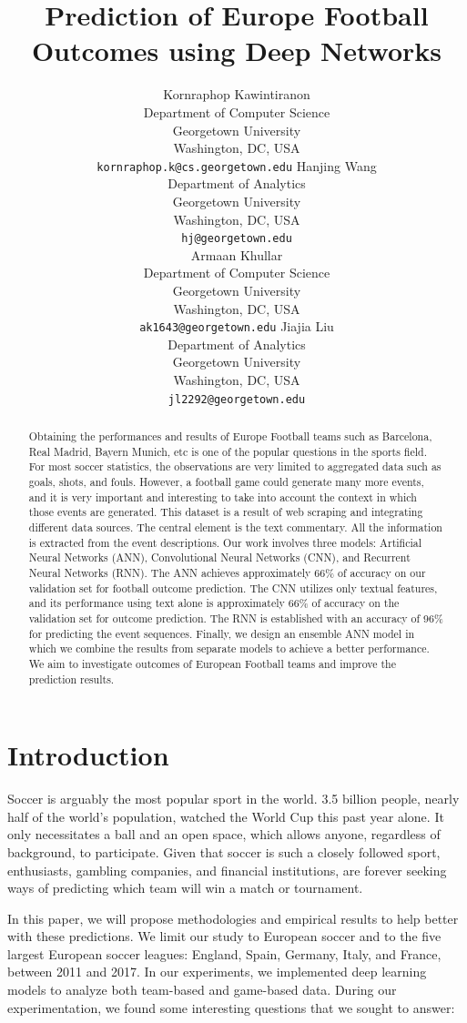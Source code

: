 \documentclass[11pt,a4paper]{article}
\title{Prediction of Europe Football Outcomes using Deep Networks}
\author{Kornraphop Kawintiranon \\
  Department of Computer Science \\
  Georgetown University \\
  Washington, DC, USA \\
  {\tt kornraphop.k@cs.georgetown.edu} \And
  Hanjing Wang \\
  Department of Analytics \\
  Georgetown University \\
  Washington, DC, USA \\
  {\tt hj@georgetown.edu}\\\AND
  Armaan Khullar \\
  Department of Computer Science \\
  Georgetown University \\
  Washington, DC, USA \\
  {\tt ak1643@georgetown.edu} \And
  Jiajia Liu \\
  Department of Analytics \\
  Georgetown University \\
  Washington, DC, USA \\
  {\tt jl2292@georgetown.edu} \\}
\date{}
\begin{document}
\maketitle
\begin{abstract}
Obtaining the performances and results of Europe Football teams such as Barcelona, Real Madrid, Bayern Munich, etc is one of the popular questions in the sports field. For most soccer statistics, the observations are very limited to aggregated data such as goals, shots, and fouls. However, a football game could generate many more events, and it is very important and interesting to take into account the context in which those events are generated. This dataset is a result of web scraping and integrating different data sources. The central element is the text commentary. All the information is extracted from the event descriptions. Our work involves three models: Artificial Neural Networks (ANN), Convolutional Neural Networks (CNN), and Recurrent Neural Networks (RNN). The ANN achieves approximately 66\% of accuracy on our validation set for football outcome prediction. The CNN utilizes only textual features, and its performance using text alone is approximately 66\% of accuracy on the validation set for outcome prediction. The RNN is established with an accuracy of 96\% for predicting the event sequences. Finally, we design an ensemble ANN model in which we combine the results from separate models to achieve a better performance. We aim to investigate outcomes of European Football teams and improve the prediction results.
\end{abstract}


\section{Introduction}

Soccer is arguably the most popular sport in the world. 3.5 billion people, nearly half of the world’s population, watched the World Cup this past year alone.  It only necessitates a ball and an open space, which allows anyone, regardless of background, to participate. Given that soccer is such a closely followed sport, enthusiasts, gambling companies, and financial institutions, are forever seeking ways of predicting which team will win a match or tournament.

In this paper, we will propose methodologies and empirical results to help better with these predictions. We limit our study to European soccer and to the five largest European soccer leagues: England, Spain, Germany, Italy, and France, between 2011 and 2017. In our experiments, we implemented deep learning models to analyze both team-based and game-based data. During our experimentation, we found some interesting questions that we sought to answer:
\end{document}
